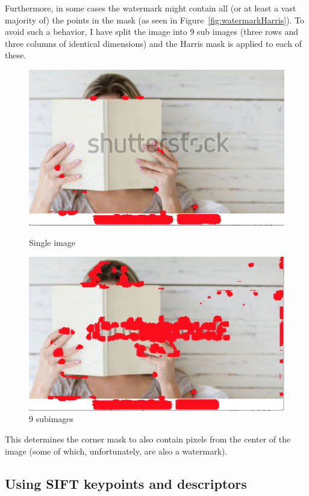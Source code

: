 Furthermore, in some cases the watermark might contain all (or at least a vast majority of) the points in the mask (as seen in Figure~\ref{fig:watermarkHarris}). To avoid such a behavior, I have split the image into 9 sub images (three rows and three columns of identical dimensions) and the Harris mask is applied to each of these.

\begin{figure}[ht!]
\centering
\begin{minipage}{.5\textwidth}
	\centering
	\includegraphics[width=.8\linewidth]{images/watermarkHarris.png}
	\caption{Single image}
	\label{fig:watermarkHarris}
\end{minipage}%
\begin{minipage}{.5\textwidth}
	\centering
	\includegraphics[width=.8\linewidth]{images/watermarkHarris9.png}
	\caption{9 subimages}
	\label{fig:watermarkHarris9}
\end{minipage}
\end{figure}

This determines the corner mask to also contain pixels from the center of the image (some of which, unfortunately, are also a watermark).


\subsection{Using SIFT keypoints and descriptors}

